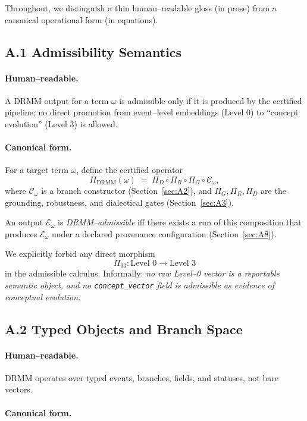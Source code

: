 \documentclass[11pt, a4paper]{article}
\begin{document}
Throughout, we distinguish a thin human–readable gloss (in prose) from a canonical operational form (in equations).

\subsection*{A.1 \quad Admissibility Semantics}

\paragraph{Human–readable.}
A DRMM output for a term $\omega$ is admissible only if it is produced by the certified pipeline; no direct promotion from event–level embeddings (Level 0) to ``concept evolution'' (Level 3) is allowed.

\paragraph{Canonical form.}
For a target term $\omega$, define the certified operator
\[
\Pi_{\mathrm{DRMM}}(\omega) \;=\; \Pi_D \circ \Pi_R \circ \Pi_G \circ \mathcal{C}_\omega,
\]
where $\mathcal{C}_\omega$ is a branch constructor (Section~\ref{sec:A2}), and $\Pi_G, \Pi_R, \Pi_D$ are the grounding, robustness, and dialectical gates (Section~\ref{sec:A3}).

An output $\mathcal{E}_\omega$ is \emph{DRMM–admissible} iff there exists a run of this composition that produces $\mathcal{E}_\omega$ under a declared provenance configuration (Section~\ref{sec:A8}).

We explicitly forbid any direct morphism
\[
\Pi_{03} : \text{Level 0} \to \text{Level 3}
\]
in the admissible calculus. Informally: \emph{no raw Level–0 vector is a reportable semantic object, and no \texttt{concept\_vector} field is admissible as evidence of conceptual evolution.}

\subsection*{A.2 \quad Typed Objects and Branch Space}
\label{sec:A2}

\paragraph{Human–readable.}
DRMM operates over typed events, branches, fields, and statuses, not bare vectors.

\paragraph{Canonical form.}
\end{document}
